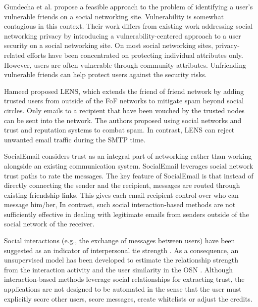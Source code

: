 Gundecha et al. \cite{gundecha_exploiting_2011} propose a feasible approach to the problem of identifying a user’s vulnerable friends on a social networking site.
Vulnerability is somewhat contagious in this context.
Their work differs from existing work addressing social networking privacy by introducing a vulnerability-centered approach to a user security on a social networking site.
On most social networking sites,
	privacy-related efforts have been concentrated on protecting individual attributes only.
However,
	users are often vulnerable through community attributes.
Unfriending vulnerable friends can help protect users against the security risks.

Hameed \cite{hameed_lens_2011} proposed LENS,
	which extends the friend of friend network by adding trusted users from outside of the FoF networks to mitigate spam beyond social circles.
Only emails to a recipient that have been vouched by the trusted nodes can be sent into the network.
The authors proposed using social networks and trust and reputation systems to combat spam.
In contrast,
	LENS can reject unwanted email traffic during the SMTP time.

SocialEmail \cite{tran_social_2010} considers trust as an integral part of networking rather than working alongside an existing communication system.
SocialEmail leverages social network trust paths to rate the messages.
The key feature of SocialEmail is that instead of directly connecting the sender and the recipient,
	messages are routed through existing friendship links.
This gives each email recipient control over who can message him/her,
In contrast,
	such social interaction-based methods are not sufficiently effective in dealing with legitimate emails from senders outside of the social network of the receiver.

Social interactions (e.g.,
	the exchange of messages between users) have been suggested as an indicator of interpersonal tie strength \cite{xiang_modeling_2010}.
As a consequence,
	an unsupervised model has been developed to estimate the 
		relationship strength from the interaction activity and the user similarity in the OSN \cite{xiang_modeling_2010}.
Although interaction-based methods leverage social relationships for extracting trust,
	the applications are not designed to be automated in the sense that the user must explicitly score other users,
	score messages,
	create whitelists or adjust the credits.

